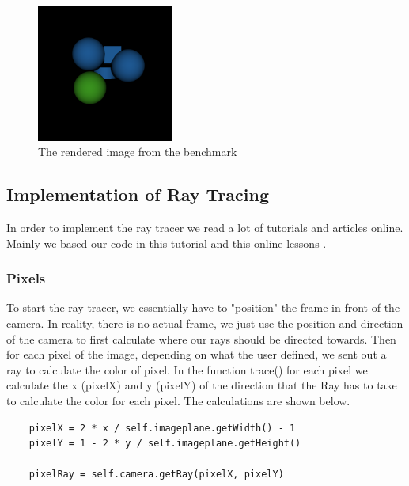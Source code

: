 \documentclass[10pt]{scrartcl}
\begin{document}
\begin{figure}[h]
  \centering
  \includegraphics[width=0.4\textwidth]{images/exmplscene.png}
  \caption{The rendered image from the benchmark} 
  \label{fig:exmplscene} 
\end{figure}

\subsection{Implementation of Ray Tracing}

In order to implement the ray tracer we read a lot of tutorials and articles online.
Mainly we based our code in this tutorial \cite{gambriel}
and this online lessons \cite{scratchaPix}.

\subsubsection{Pixels}
To start the ray tracer, we essentially have to "position" the frame in front of the camera. In reality, there is no actual frame, we just use the position and direction of the camera to first calculate where our rays should be directed towards. Then for each pixel of the image, depending on what the user defined, we sent out a ray to calculate the color of pixel. In the function trace() for each pixel we calculate the x (pixelX) and y (pixelY) of the direction that the Ray has to take to calculate the color for each pixel. The calculations are shown below.

\begin{lstlisting}
    pixelX = 2 * x / self.imageplane.getWidth() - 1
    pixelY = 1 - 2 * y / self.imageplane.getHeight()

    pixelRay = self.camera.getRay(pixelX, pixelY)
\end{lstlisting}
\end{document}
